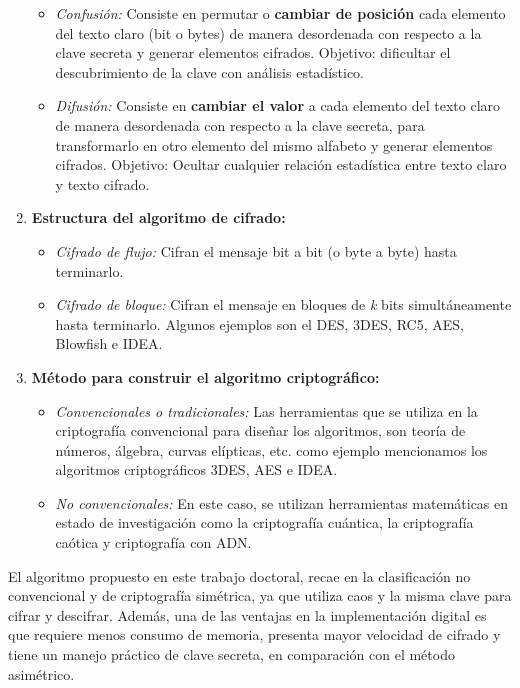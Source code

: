 \begin{enumerate}
\begin{itemize}
\item \textit{Confusión:} Consiste en permutar o\textbf{ cambiar de posición} cada elemento del texto claro (bit o bytes) de manera desordenada con respecto a la clave secreta y generar elementos cifrados. Objetivo: dificultar el descubrimiento de la clave con análisis estadístico. 
\item \textit{Difusión:} Consiste en \textbf{cambiar el valor} a cada elemento del texto claro de manera desordenada con respecto a la clave secreta, para transformarlo en otro elemento del mismo alfabeto y generar elementos cifrados. Objetivo: Ocultar cualquier relación estadística entre texto claro y texto cifrado. 
\end{itemize} 
\item \textbf{Estructura del algoritmo de cifrado:}
\begin{itemize}
\item \textit{Cifrado de flujo:} Cifran el mensaje bit a bit (o byte a byte) hasta terminarlo. 
\item \textit{Cifrado de bloque:} Cifran el mensaje en bloques de \textit{k} bits simultáneamente hasta terminarlo. Algunos ejemplos son el DES, 3DES, RC5, AES, Blowfish e IDEA. 
\end{itemize} 
\item \textbf{Método para construir el algoritmo criptográfico:}
\begin{itemize}
\item \textit{Convencionales o tradicionales:} Las herramientas que se utiliza en la criptografía convencional para diseñar los algoritmos, son teoría de números, álgebra, curvas elípticas, etc. como ejemplo mencionamos los algoritmos criptográficos 3DES, AES e IDEA. 
\item \textit{No convencionales:} En este caso, se utilizan herramientas matemáticas en estado de investigación como la criptografía cuántica, la criptografía caótica y criptografía con ADN.
\end{itemize}
\end{enumerate} 

El algoritmo propuesto en este trabajo doctoral, recae en la clasificación no convencional y de criptografía simétrica, ya que utiliza caos y la misma clave para cifrar y descifrar. Además, una de las ventajas en la implementación digital es que requiere menos consumo de memoria, presenta mayor velocidad de cifrado y tiene un manejo práctico de clave secreta, en comparación con el método asimétrico. 

